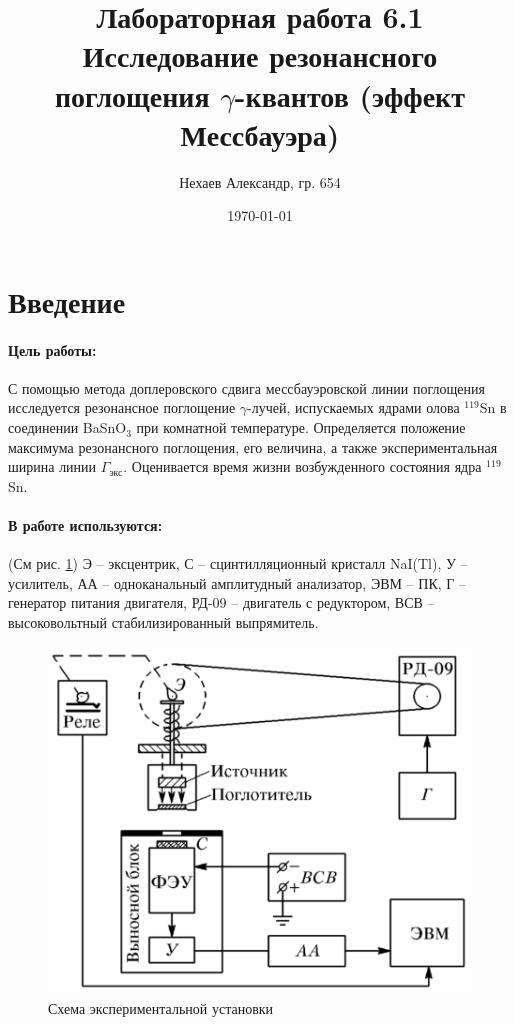 \documentclass[a4paper, 12pt]{article}
\title{Лабораторная работа 6.1\\Исследование резонансного поглощения $\gamma$-квантов (эффект Мессбауэра)}
\author{Нехаев Александр, гр. 654}
\date{\today}
\begin{document}
	\maketitle
	\newpage
	\tableofcontents
	\newpage
	\section{Введение}
	\paragraph{Цель работы:}
	С помощью метода доплеровского сдвига мессбауэровской линии поглощения исследуется резонансное поглощение $\gamma$-лучей, испускаемых ядрами олова $^{119}$Sn в соединении BaSnO$_3$ при комнатной температуре. Определяется положение максимума резонансного поглощения, его величина, а также экспериментальная ширина линии $\Gamma_{\text{экс}}$. Оценивается время жизни возбужденного состояния ядра $^{119}$Sn.
	\paragraph{В работе используются:}
	(См рис. \ref{fig1})
	Э – эксцентрик,
	С – сцинтилляционный кристалл NaI(Tl), У – усилитель, АА – одноканальный амплитудный анализатор, ЭВМ – ПК, Г – генератор питания двигателя, РД-09 – двигатель с редуктором, ВСВ – высоковольтный стабилизированный выпрямитель.\par
	\begin{figure}[h]
		\centering
		\includegraphics[scale=0.2]{scheme.png}
		\caption{Схема экспериментальной установки}
		\label{fig1}
	\end{figure}
\end{document}
